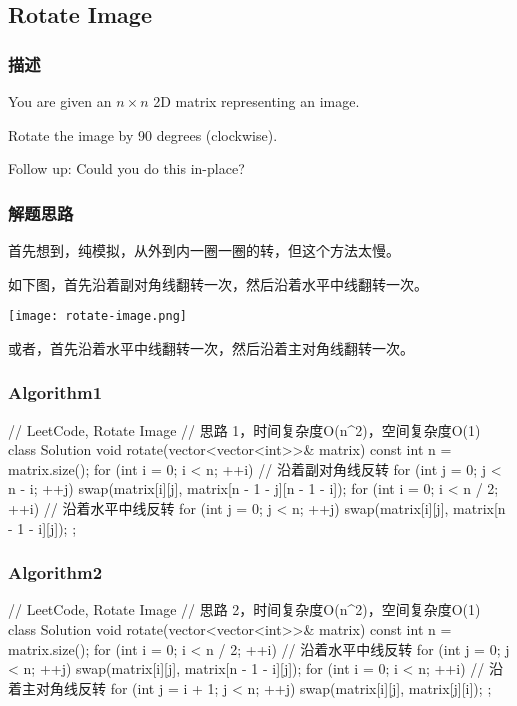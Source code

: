 \subsection{Rotate Image} %
\label{sec:rotate-image}


\subsubsection{描述}
You are given an $n \times n$ 2D matrix representing an image.

Rotate the image by 90 degrees (clockwise).

Follow up:
Could you do this in-place?


\subsubsection{解题思路}
首先想到，纯模拟，从外到内一圈一圈的转，但这个方法太慢。

如下图，首先沿着副对角线翻转一次，然后沿着水平中线翻转一次。

\begin{center}
	\texttt{[image: rotate-image.png]}\\
	\label{fig:rotate-image}
\end{center}

或者，首先沿着水平中线翻转一次，然后沿着主对角线翻转一次。


\subsubsection{Algorithm1}
\begin{Code}
	// LeetCode, Rotate Image
	// 思路 1，时间复杂度O(n^2)，空间复杂度O(1)
	class Solution {
		void rotate(vector<vector<int>>& matrix) {
			const int n = matrix.size();
			for (int i = 0; i < n; ++i)  // 沿着副对角线反转
				for (int j = 0; j < n - i; ++j)
					swap(matrix[i][j], matrix[n - 1 - j][n - 1 - i]);
			for (int i = 0; i < n / 2; ++i) // 沿着水平中线反转
				for (int j = 0; j < n; ++j)
					swap(matrix[i][j], matrix[n - 1 - i][j]);
		}
	};
\end{Code}

\subsubsection{Algorithm2}
\begin{Code}
	// LeetCode, Rotate Image
	// 思路 2，时间复杂度O(n^2)，空间复杂度O(1)
	class Solution {
		void rotate(vector<vector<int>>& matrix) {
			const int n = matrix.size();
			for (int i = 0; i < n / 2; ++i) // 沿着水平中线反转
				for (int j = 0; j < n; ++j)
					swap(matrix[i][j], matrix[n - 1 - i][j]);
			for (int i = 0; i < n; ++i)  // 沿着主对角线反转
				for (int j = i + 1; j < n; ++j)
					swap(matrix[i][j], matrix[j][i]);
		}
	};
\end{Code}


